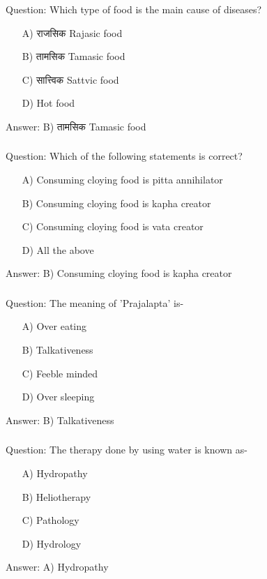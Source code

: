 \begin{frame}[fragile]\frametitle{}

Question: Which type of food is the main cause of diseases?

\begin{itemize}
\item[A)] राजसिक Rajasic food
\item[B)] तामसिक Tamasic food
\item[C)] सात्त्विक Sattvic food
\item[D)] Hot food
\end{itemize}

Answer: B) तामसिक Tamasic food
\end{frame}


\begin{frame}[fragile]\frametitle{}

Question: Which of the following statements is correct?

\begin{itemize}
\item[A)] Consuming cloying food is pitta annihilator
\item[B)] Consuming cloying food is kapha creator
\item[C)] Consuming cloying food is vata creator
\item[D)] All the above
\end{itemize}

Answer: B) Consuming cloying food is kapha creator
\end{frame}

\begin{frame}[fragile]\frametitle{}

Question: The meaning of 'Prajalapta' is-

\begin{itemize}
\item[A)] Over eating
\item[B)] Talkativeness
\item[C)] Feeble minded
\item[D)] Over sleeping
\end{itemize}

Answer: B) Talkativeness
\end{frame}

\begin{frame}[fragile]\frametitle{}

Question: The therapy done by using water is known as-

\begin{itemize}
\item[A)] Hydropathy
\item[B)] Heliotherapy
\item[C)] Pathology
\item[D)] Hydrology
\end{itemize}

Answer: A) Hydropathy
\end{frame}

